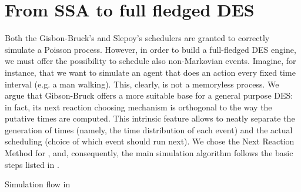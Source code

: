 \documentclass[12pt,a4paper,twoside,openright]{book}
\begin{document}
\section{From SSA to full fledged DES}

Both the Gisbon-Bruck's and Slepoy's schedulers are granted to correctly simulate a Poisson process.
%
However, in order to build a full-fledged DES engine, we must offer the possibility to schedule also non-Markovian events.
%
Imagine, for instance, that we want to simulate an agent that does an action every fixed time interval (e.g. a man walking).
%
This, clearly, is not a memoryless process.
%
We argue that Gibson-Bruck offers a more suitable base for a general purpose DES: in fact, its next reaction choosing mechanism is orthogonal to the way the putative times are computed.
%
This intrinsic feature allows to neatly separate the generation of times (namely, the time distribution of each event) and the actual scheduling (choice of which event should run next).
%
We chose the Next Reaction Method for \alchemist{}, and, consequently, the main simulation algorithm follows the basic steps listed in .

\begin{algorithm}
\begin{distribalgo}[1]
\vspace{5pt}
  \ENDFOR
\ENDFOR
{}
      \ENDFOR
    \ENDIF
\ENDWHILE
\caption{Simulation flow in \alchemist{}}
\label{algo:engine}
\end{distribalgo}
\end{algorithm}
\end{document}
